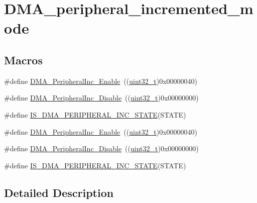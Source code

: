 \hypertarget{group___d_m_a__peripheral__incremented__mode}{}\section{D\+M\+A\+\_\+peripheral\+\_\+incremented\+\_\+mode}
\label{group___d_m_a__peripheral__incremented__mode}
\subsection*{Macros}
\begin{DoxyCompactItemize}
\item 
\#define \hyperlink{group___d_m_a__peripheral__incremented__mode_gaf7921ea423fb60701a091c508cd0f33a}{D\+M\+A\+\_\+\+Peripheral\+Inc\+\_\+\+Enable}~((\hyperlink{_p_e___types_8h_a33594304e786b158f3fb30289278f5af}{uint32\+\_\+t})0x00000040)
\item 
\#define \hyperlink{group___d_m_a__peripheral__incremented__mode_ga0fe3ff9c67bec802dd239fd17c3dbd31}{D\+M\+A\+\_\+\+Peripheral\+Inc\+\_\+\+Disable}~((\hyperlink{_p_e___types_8h_a33594304e786b158f3fb30289278f5af}{uint32\+\_\+t})0x00000000)
\item 
\#define \hyperlink{group___d_m_a__peripheral__incremented__mode_ga28762105b3f567c16ba79a47e68ff0fa}{I\+S\+\_\+\+D\+M\+A\+\_\+\+P\+E\+R\+I\+P\+H\+E\+R\+A\+L\+\_\+\+I\+N\+C\+\_\+\+S\+T\+A\+TE}(S\+T\+A\+TE)
\item 
\#define \hyperlink{group___d_m_a__peripheral__incremented__mode_gaf7921ea423fb60701a091c508cd0f33a}{D\+M\+A\+\_\+\+Peripheral\+Inc\+\_\+\+Enable}~((\hyperlink{_p_e___types_8h_a33594304e786b158f3fb30289278f5af}{uint32\+\_\+t})0x00000040)
\item 
\#define \hyperlink{group___d_m_a__peripheral__incremented__mode_ga0fe3ff9c67bec802dd239fd17c3dbd31}{D\+M\+A\+\_\+\+Peripheral\+Inc\+\_\+\+Disable}~((\hyperlink{_p_e___types_8h_a33594304e786b158f3fb30289278f5af}{uint32\+\_\+t})0x00000000)
\item 
\#define \hyperlink{group___d_m_a__peripheral__incremented__mode_ga28762105b3f567c16ba79a47e68ff0fa}{I\+S\+\_\+\+D\+M\+A\+\_\+\+P\+E\+R\+I\+P\+H\+E\+R\+A\+L\+\_\+\+I\+N\+C\+\_\+\+S\+T\+A\+TE}(S\+T\+A\+TE)
\end{DoxyCompactItemize}


\subsection{Detailed Description}


